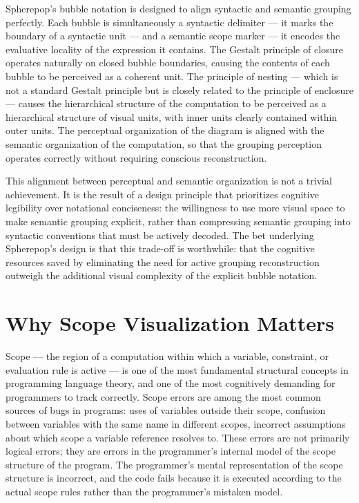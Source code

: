 \documentclass[12pt,openany]{book}
\theoremstyle{plain}
\theoremstyle{definition}
\theoremstyle{remark}
\begin{document}
Spherepop's bubble notation is designed to align syntactic and semantic grouping perfectly. Each bubble is simultaneously a syntactic delimiter — it marks the boundary of a syntactic unit — and a semantic scope marker — it encodes the evaluative locality of the expression it contains. The Gestalt principle of closure operates naturally on closed bubble boundaries, causing the contents of each bubble to be perceived as a coherent unit. The principle of nesting — which is not a standard Gestalt principle but is closely related to the principle of enclosure — causes the hierarchical structure of the computation to be perceived as a hierarchical structure of visual units, with inner units clearly contained within outer units. The perceptual organization of the diagram is aligned with the semantic organization of the computation, so that the grouping perception operates correctly without requiring conscious reconstruction.

This alignment between perceptual and semantic organization is not a trivial achievement. It is the result of a design principle that prioritizes cognitive legibility over notational conciseness: the willingness to use more visual space to make semantic grouping explicit, rather than compressing semantic grouping into syntactic conventions that must be actively decoded. The bet underlying Spherepop's design is that this trade-off is worthwhile: that the cognitive resources saved by eliminating the need for active grouping reconstruction outweigh the additional visual complexity of the explicit bubble notation.

\section{Why Scope Visualization Matters}

Scope — the region of a computation within which a variable, constraint, or evaluation rule is active — is one of the most fundamental structural concepts in programming language theory, and one of the most cognitively demanding for programmers to track correctly. Scope errors are among the most common sources of bugs in programs: uses of variables outside their scope, confusion between variables with the same name in different scopes, incorrect assumptions about which scope a variable reference resolves to. These errors are not primarily logical errors; they are errors in the programmer's internal model of the scope structure of the program. The programmer's mental representation of the scope structure is incorrect, and the code fails because it is executed according to the actual scope rules rather than the programmer's mistaken model.
\end{document}
